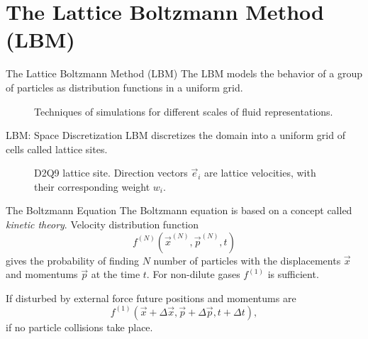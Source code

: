 \documentclass{beamer}
\begin{document}
\section{The Lattice Boltzmann Method (LBM)}
\begin{frame}{The Lattice Boltzmann Method (LBM)}
The LBM models the behavior of a group of particles as distribution functions in a uniform grid.
\begin{figure}[H]
\centering
\begin{scriptsize}
\def\svgwidth{\linewidth}

\end{scriptsize}
\caption{Techniques of simulations for different scales of fluid representations.}
\label{fig:scales}
\end{figure}
\end{frame}

\begin{frame}{LBM: Space Discretization}
LBM discretizes the domain into a uniform grid of cells called lattice sites.
\begin{figure}[!htb]
\centering
\begin{minipage}[t]{.45\textwidth}
	\centering
	\begin{tiny}
	\def\svgwidth{0.9\linewidth}
	
	\end{tiny}
	\caption{D3Q19 lattice site.}
	\label{fig:d2q9_1}
\end{minipage}\qquad%
\begin{minipage}[t]{.45\textwidth}
	\centering
	\begin{tiny}
	\def\svgwidth{0.9\linewidth}
	
	\end{tiny}
	\caption{D2Q9 lattice site. Direction vectors $\vec{e}_i$ are lattice velocities, with their corresponding weight $w_i$.}
	\label{fig:d2q9_2}
\end{minipage}
\end{figure}
\end{frame}

\begin{frame}{The Boltzmann Equation}
The Boltzmann equation is based on a concept called \textit{kinetic theory}. Velocity distribution function
\begin{equation}
f^{(N)}(\vec{x}^{(N)}, \vec{p}^{(N)}, t)
\end{equation}
gives the probability of finding $N$ number of particles with the displacements $\vec{x}$ and momentums $\vec{p}$ at the time $t$. For non-dilute gases $f^{(1)}$ is sufficient.

If disturbed by external force future positions and momentums are
\begin{equation}
f^{(1)}(\vec{x}+\Delta \vec{x}, \vec{p}+\Delta \vec{p}, t+\Delta t),
\end{equation}
if no particle collisions take place.
\end{frame}
\end{document}
